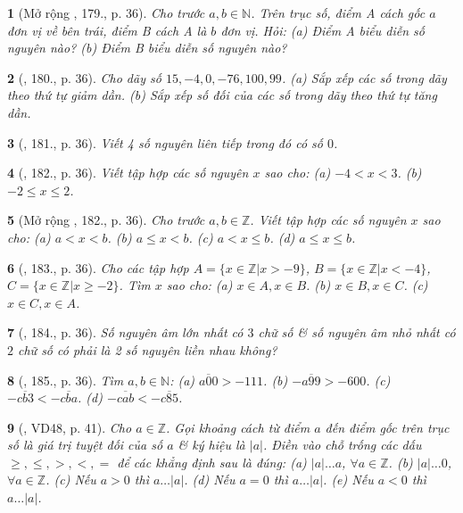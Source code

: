 \documentclass{article}
\newtheorem{baitoan}{}
\begin{document}
\begin{baitoan}[Mở rộng \cite{Tuyen_Toan_6}, 179., p. 36]
	Cho trước $a,b\in\mathbb{N}$. Trên trục số, điểm A cách gốc $a$ đơn vị về bên trái, điểm B cách A là $b$ đơn vị. Hỏi: (a) Điểm A biểu diễn số nguyên nào? (b) Điểm B biểu diễn số nguyên nào?
\end{baitoan}

\begin{baitoan}[\cite{Tuyen_Toan_6}, 180., p. 36]
	Cho dãy số $15,-4,0,-76,100,99$. (a) Sắp xếp các số trong dãy theo thứ tự giảm dần. (b) Sắp xếp số đối của các số trong dãy theo thứ tự tăng dần.
\end{baitoan}

\begin{baitoan}[\cite{Tuyen_Toan_6}, 181., p. 36]
	Viết 4 số nguyên liên tiếp trong đó có số $0$.
\end{baitoan}

\begin{baitoan}[\cite{Tuyen_Toan_6}, 182., p. 36]
	Viết tập hợp các số nguyên $x$ sao cho: (a) $-4 < x < 3$. (b) $-2\le x\le 2$.
\end{baitoan}

\begin{baitoan}[Mở rộng \cite{Tuyen_Toan_6}, 182., p. 36]
	Cho trước $a,b\in\mathbb{Z}$. Viết tập hợp các số nguyên $x$ sao cho: (a) $a < x < b$. (b) $a\le x < b$. (c) $a < x\le b$. (d) $a\le x\le b$.
\end{baitoan}

\begin{baitoan}[\cite{Tuyen_Toan_6}, 183., p. 36]
	Cho các tập hợp $A = \{x\in\mathbb{Z}|x > -9\}$, $B = \{x\in\mathbb{Z}|x < -4\}$, $C = \{x\in\mathbb{Z}|x\ge-2\}$. Tìm $x$ sao cho: (a) $x\in A,x\in B$. (b) $x\in B,x\in C$. (c) $x\in C,x\in A$.
\end{baitoan}

\begin{baitoan}[\cite{Tuyen_Toan_6}, 184., p. 36]
	Số nguyên âm lớn nhất có $3$ chữ số \& số nguyên âm nhỏ nhất có $2$ chữ số có phải là 2 số nguyên liền nhau không?
\end{baitoan}

\begin{baitoan}[\cite{Tuyen_Toan_6}, 185., p. 36]
	Tìm $a,b\in\mathbb{N}$: (a) $\overline{a00} > -111$. (b) $-\overline{a99} > -600$. (c) $-\overline{cb3} < -\overline{cba}$. (d) $-\overline{cab} < -\overline{c85}$.
\end{baitoan}

\begin{baitoan}[\cite{Binh_Toan_6_tap_1}, VD48, p. 41]
	Cho $a\in\mathbb{Z}$. Gọi khoảng cách từ điểm $a$ đến điểm gốc trên trục số là \emph{giá trị tuyệt đối} của số $a$ \& ký hiệu là $|a|$. Điền vào chỗ trống các dấu $\ge,\le,>,<,=$ để các khẳng định sau là đúng: (a) $|a|\ldots a$, $\forall a\in\mathbb{Z}$. (b) $|a|\ldots 0$, $\forall a\in\mathbb{Z}$. (c) Nếu $a > 0$ thì $a\ldots|a|$. (d) Nếu $a = 0$ thì $a\ldots|a|$. (e) Nếu $a < 0$ thì $a\ldots|a|$.	
\end{baitoan}
\end{document}
